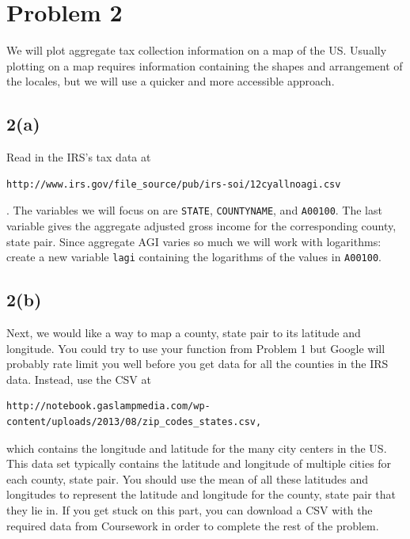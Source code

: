 \documentclass[11pt]{article}
\theoremstyle{plain}
\theoremstyle{definition}
\begin{document}
\section*{Problem 2}

We will plot aggregate tax collection information on a map of the US. Usually plotting on a map requires information containing the shapes and arrangement of the locales, but we will use a quicker and more accessible approach.

\subsection*{2(a)}
Read in the IRS's tax data at
\begin{verbatim}
http://www.irs.gov/file_source/pub/irs-soi/12cyallnoagi.csv
\end{verbatim}.
 The variables we will focus on are \texttt{STATE}, \texttt{COUNTYNAME}, and \texttt{A00100}. The last variable gives the aggregate adjusted gross income for the corresponding county, state pair. Since aggregate AGI varies so much we will work with logarithms: create a new variable \texttt{lagi} containing the logarithms of the values in  \texttt{A00100}.

\subsection*{2(b)}
Next, we would like a way to map a county, state pair to its latitude
and longitude. You could try to use your function from Problem 1 but
Google will probably rate limit you well before you get data for all
the  counties in the IRS data. Instead, use the CSV at
\begin{verbatim}
http://notebook.gaslampmedia.com/wp-content/uploads/2013/08/zip_codes_states.csv,
\end{verbatim}
which contains the longitude and latitude for the many city centers in the US. This data set typically contains the latitude and longitude of multiple cities for each county, state pair. You should use the mean of all these latitudes and longitudes to represent the latitude and longitude for the county, state pair that they lie in. If you get stuck on this part, you can download a CSV with the required data from Coursework in order to complete the rest of the problem.
\end{document}
